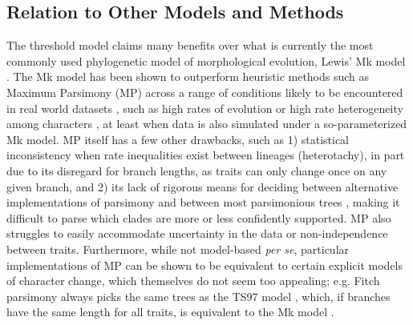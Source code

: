 \documentclass[10pt, twocolumn, twoside]{article}
\begin{document}
\subsection{Relation to Other Models and Methods}

The threshold model claims many benefits over what is currently the most commonly used phylogenetic model of morphological evolution, Lewis’ Mk model \citep{lewisLikelihoodApproachEstimating2001}. The Mk model has been shown to outperform heuristic methods such as Maximum Parsimony (MP) across a range of conditions likely to be encountered in real world datasets \citep{wrightBayesianAnalysisUsing2014, wrightModelingCharacterChange2016}, such as high rates of evolution or high rate heterogeneity among characters \citep{wagnerModellingRateDistributions2012}, at least when data is also simulated under a so-parameterized Mk model. MP itself has a few other drawbacks, such as 1) statistical inconsistency when rate inequalities exist between lineages (heterotachy), in part due to its disregard for branch lengths, as traits can only change once on any given branch, and 2) its lack of rigorous means for deciding between alternative implementations of parsimony and between most parsimonious trees \citep{felsensteinInferringPhylogenies2004}, making it difficult to parse which clades are more or less confidently supported. MP also struggles to easily accommodate uncertainty in the data or non-independence between traits. Furthermore, while not model-based \textit{per se}, particular implementations of MP can be shown to be equivalent to certain explicit models of character change, which themselves do not seem too appealing; e.g. Fitch parsimony \citep{fitchDefiningCourseEvolution1971} always picks the same trees as the TS97 model \citep{tuffleyLinksMaximumLikelihood1997}, which, if branches have the same length for all traits, is equivalent to the Mk model \citep{lewisLikelihoodApproachEstimating2001, steelParsimonyLikelihoodRole2000}. 
\end{document}
